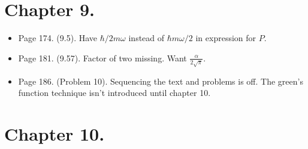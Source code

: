 \section{Chapter 9.}
\begin{itemize}
\item Page 174.  (9.5).  Have $\hbar/2m\omega$ instead of $\hbar m \omega/2$ in expression for $P$.
\item Page 181.  (9.57).  Factor of two missing.  Want $\frac{\alpha}{2 \sqrt{\pi}}$.
\item Page 186.  (Problem 10).  Sequencing the text and problems is off.  The green's function technique isn't introduced until chapter 10.
\end{itemize}

\section{Chapter 10.}
